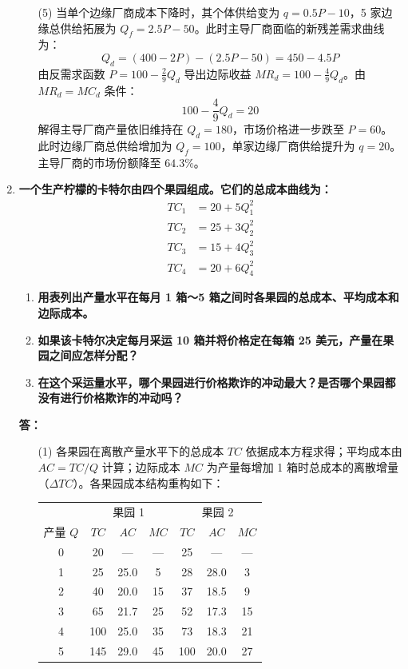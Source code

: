 \begin{enumerate}[label=\textbf{\arabic*.}, leftmargin=*]
\begin{enumerate}
			\item[(5)] 当单个边缘厂商成本下降时，其个体供给变为 $q = 0.5P - 10$，5 家边缘总供给拓展为 $Q_f = 2.5P - 50$。此时主导厂商面临的新残差需求曲线为：
			\[ Q_d = (400 - 2P) - (2.5P - 50) = 450 - 4.5P \]
			由反需求函数 $P = 100 - \frac{2}{9}Q_d$ 导出边际收益 $MR_d = 100 - \frac{4}{9}Q_d$。由 $MR_d = MC_d$ 条件：
			\[ 100 - \frac{4}{9}Q_d = 20 \]
			解得主导厂商产量依旧维持在 $Q_d = 180$，市场价格进一步跌至 $P = 60$。此时边缘厂商总供给增加为 $Q_f = 100$，单家边缘厂商供给提升为 $q = 20$。主导厂商的市场份额降至 $64.3\%$。
		\end{enumerate}
		\newpage
		\item \textbf{一个生产柠檬的卡特尔由四个果园组成。它们的总成本曲线为：}
		\[
		\begin{aligned}
			TC_1 &= 20 + 5Q_1^2 \\
			TC_2 &= 25 + 3Q_2^2 \\
			TC_3 &= 15 + 4Q_3^2 \\
			TC_4 &= 20 + 6Q_4^2
		\end{aligned}
		\]
		
		\begin{enumerate}
			\item \textbf{用表列出产量水平在每月 1 箱～5 箱之间时各果园的总成本、平均成本和边际成本。}
			\item \textbf{如果该卡特尔决定每月采运 10 箱并将价格定在每箱 25 美元，产量在果园之间应怎样分配？}
			\item \textbf{在这个采运量水平，哪个果园进行价格欺诈的冲动最大？是否哪个果园都没有进行价格欺诈的冲动吗？}
		\end{enumerate}
		
		\textbf{答：}
		\begin{enumerate}
			\item[(1)] 各果园在离散产量水平下的总成本 $TC$ 依据成本方程求得；平均成本由 $AC = TC / Q$ 计算；边际成本 $MC$ 为产量每增加 1 箱时总成本的离散增量（$\Delta TC$）。各果园成本结构重构如下：
			
			\begin{center}
				\renewcommand{\arraystretch}{1.2}
				\setlength{\tabcolsep}{5pt}
				\begin{tabular}{ccccccc}
					\hline
					& \multicolumn{3}{c}{果园 1} & \multicolumn{3}{c}{果园 2} \\
					\cline{2-4} \cline{5-7}
					产量 $Q$ & $TC$ & $AC$ & $MC$ & $TC$ & $AC$ & $MC$ \\
					\hline
					0 & 20 & ---  & --- & 25 & ---  & --- \\
					1 & 25 & 25.0 & 5   & 28 & 28.0 & 3   \\
					2 & 40 & 20.0 & 15  & 37 & 18.5 & 9   \\
					3 & 65 & 21.7 & 25  & 52 & 17.3 & 15  \\
					4 & 100& 25.0 & 35  & 73 & 18.3 & 21  \\
					5 & 145& 29.0 & 45  & 100& 20.0 & 27  \\
					\hline
				\end{tabular}
			\end{center}
			

\end{enumerate}
\end{enumerate}
